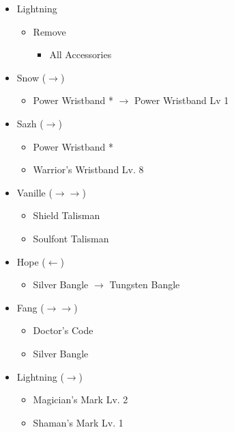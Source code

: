 \begin{menu}
\begin{multicols}{2}
\begin{itemize}
    \equip
    \begin{itemize}
        \item Lightning
        \begin{itemize}
            \item Remove
            \begin{itemize}
                \item All Accessories
            \end{itemize}
        \end{itemize}
        \item Snow ($\rightarrow$)
            \begin{itemize}
                \item Power Wristband * $\rightarrow$ Power Wristband Lv 1
            \end{itemize}
        \item Sazh ($\rightarrow$)
        \begin{itemize}
                \item Power Wristband *
                \item Warrior's Wristband Lv. 8
            \end{itemize}
        \columnbreak
        \item Vanille ($\rightarrow\rightarrow$)
        \begin{itemize}
                \item Shield Talisman
                \item Soulfont Talisman
        \end{itemize}
        \item Hope ($\leftarrow$)
            \begin{itemize}
                \item Silver Bangle $\rightarrow$ Tungsten Bangle
            \end{itemize}
        \item Fang ($\rightarrow\rightarrow$)
            \begin{itemize}
                \item Doctor's Code
                \item Silver Bangle
        \end{itemize}
        \item Lightning ($\rightarrow$)
        \begin{itemize}
                \item Magician's Mark Lv. 2
                \item Shaman's Mark Lv. 1
        \end{itemize}
    \end{itemize}
\end{itemize}
\end{multicols}
\end{menu}
